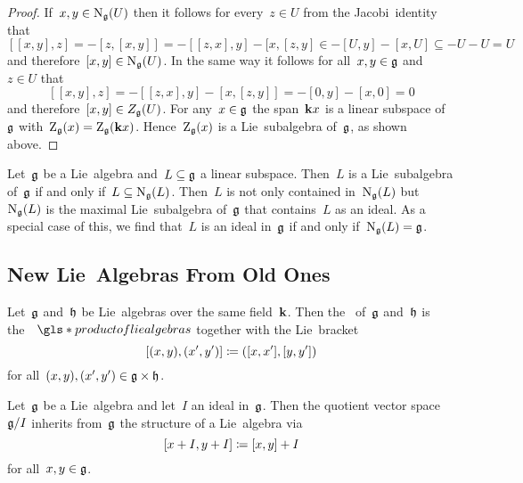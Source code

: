 \begin{proof}
 If~$x, y \in \operatorname{N}_{\mathfrak{g}}(U)$ then it follows for every~$z \in U$ from the Jacobi~identity that
 \[
  [[x,y], z]
  =
  - [z, [x,y]]
  =
  - [[z,x], y] - [x, [z,y]
  \in
  - [U, y] - [x, U]
  \subseteq
  - U - U
  =
  U
 \]
 and therefore~$[x,y] \in \operatorname{N}_{\mathfrak{g}}(U)$.
 In the same way it follows for all~$x, y \in \mathfrak{g}$ and~$z \in U$ that
 \[
  [[x,y], z]
  =
  - [[z,x], y] - [x, [z,y]]
  =
  - [0, y] - [x, 0]
  =
  0
 \]
 and therefore~$[x,y] \in Z_{\mathfrak{g}}(U)$.
 For any~$x \in \mathfrak{g}$ the span~$\mathbf{k} x$ is a linear subspace of~$\mathfrak{g}$ with~$\operatorname{Z}_{\mathfrak{g}}(x) = \operatorname{Z}_{\mathfrak{g}}(\mathbf{k} x)$.
 Hence~$\operatorname{Z}_{\mathfrak{g}}(x)$ is a Lie~subalgebra of~$\mathfrak{g}$, as shown above.
\end{proof}


\begin{remark}
 Let~$\mathfrak{g}$ be a Lie~algebra and~$L \subseteq \mathfrak{g}$ a linear subspace.
 Then~$L$ is a Lie~subalgebra of~$\mathfrak{g}$ if and only if~$L \subseteq \operatorname{N}_{\mathfrak{g}}(L)$.
 Then~$L$ is not only contained in~$\operatorname{N}_{\mathfrak{g}}(L)$ but~$\operatorname{N}_{\mathfrak{g}}(L)$ is the maximal Lie~subalgebra of~$\mathfrak{g}$ that contains~$L$ as an ideal.
 As a special case of this, we find that~$L$ is an ideal in~$\mathfrak{g}$ if and only if~$\operatorname{N}_{\mathfrak{g}}(L) = \mathfrak{g}$.
\end{remark}





\subsection{New Lie~Algebras From Old Ones}


\begin{definition}
  Let~$\mathfrak{g}$ and~$\mathfrak{h}$ be Lie~algebras over the same field~$\kf$.
  Then the \, of~$\mathfrak{g}$ and~$\mathfrak{h}$ is the~{\vectorspace{$\kf$}}~$\gls*{product of lie algebras}$ together with the Lie~bracket
  \[
    [(x,y), (x',y')]
    \coloneqq
    ([x, x'], [y, y'])
  \]
  for all~$(x,y), (x',y') \in \mathfrak{g} \times \mathfrak{h}$.
\end{definition}


\begin{lemma}
  \label{construction of quotient lie algebra}
  Let~$\mathfrak{g}$ be a Lie~algebra and let~$I$ an ideal in~$\mathfrak{g}$.
  Then the quotient vector space~$\mathfrak{g}/I$ inherits from~$\mathfrak{g}$ the structure of a Lie~algebra via
  \[
    [x+I, y+I]
    \coloneqq
    [x,y] + I
  \]
  for all~$x, y \in \mathfrak{g}$.
\end{lemma}


